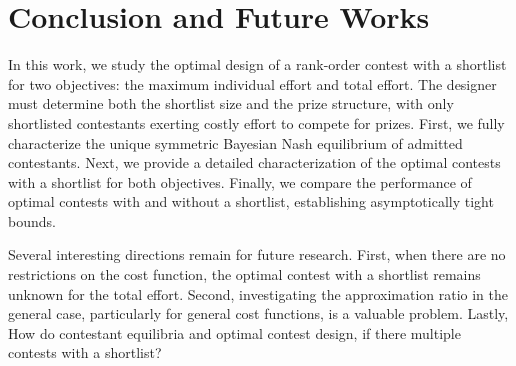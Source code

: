 \section{Conclusion and Future Works}
\label{sec:conclusion}


In this work, we study the optimal design of a rank-order contest with a shortlist for two objectives: the maximum individual effort and total effort. The designer must determine both the shortlist size and the prize structure, with only shortlisted contestants exerting costly effort to compete for prizes.
First, we fully characterize the unique symmetric Bayesian Nash equilibrium of admitted contestants. Next, we provide a detailed characterization of the optimal contests with a shortlist for both objectives. Finally, we compare the performance of optimal contests with and without a shortlist, establishing asymptotically tight bounds.

Several interesting directions remain for future research. First, when there are no restrictions on the cost function, the optimal contest with a shortlist remains unknown for the total effort. Second, investigating the approximation ratio in the general case, particularly for general cost functions, is a valuable problem. Lastly, How do contestant equilibria and optimal contest design, if there multiple contests with a shortlist?



